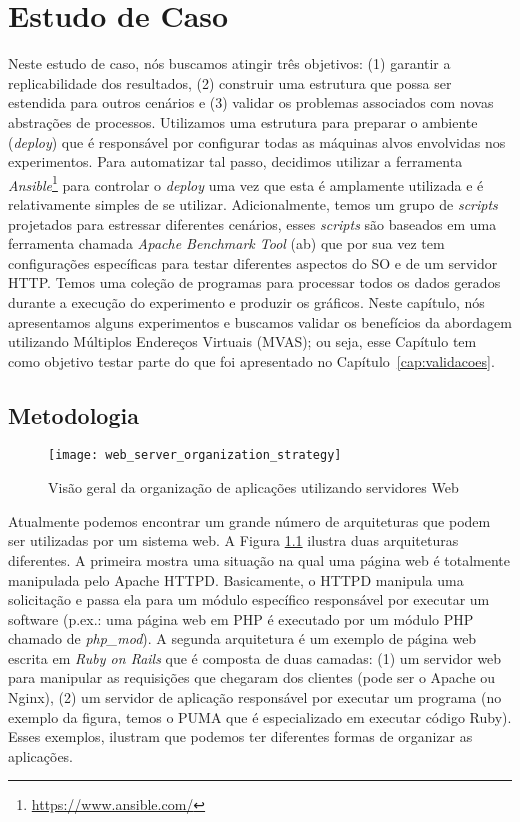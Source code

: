 \chapter{Estudo de Caso}
\label{cap:estudo-de-caso}

Neste estudo de caso, nós buscamos atingir três objetivos: (1) garantir a
replicabilidade dos resultados, (2) construir uma estrutura que possa ser
estendida para outros cenários e (3) validar os problemas associados com novas
abstrações de processos. Utilizamos uma estrutura para preparar o ambiente
(\emph{deploy}) que é responsável por configurar todas as máquinas alvos
envolvidas nos experimentos. Para automatizar tal passo, decidimos utilizar a
ferramenta \emph{Ansible}\footnote{\url{https://www.ansible.com/}} para
controlar o \emph{deploy} uma vez que esta é amplamente utilizada e é
relativamente simples de se utilizar. Adicionalmente, temos um grupo de \emph{scripts}
projetados para estressar diferentes cenários, esses \emph{scripts} são baseados em
uma ferramenta chamada \emph{Apache Benchmark Tool} (ab) que por sua vez tem
configurações específicas para testar diferentes aspectos do SO e de um servidor
HTTP. Temos uma coleção de programas para processar todos os dados gerados
durante a execução do experimento e produzir os gráficos. Neste capítulo, nós
apresentamos alguns experimentos e buscamos validar os benefícios da abordagem
utilizando Múltiplos Endereços Virtuais (MVAS); ou seja, esse Capítulo tem como
objetivo testar parte do que foi apresentado no Capítulo~\ref{cap:validacoes}.

\section{Metodologia} \label{sec:metodologia}

\begin{figure}[!h] \centering
  \texttt{[image: web\_server\_organization\_strategy]}
  \caption{Visão geral da organização de aplicações utilizando servidores Web}
\label{fig:web_server} \end{figure}

Atualmente podemos encontrar um grande número de arquiteturas que podem ser
utilizadas por um sistema web. A Figura \ref{fig:web_server} ilustra duas
arquiteturas diferentes. A primeira mostra uma situação na qual uma página web
é totalmente manipulada pelo Apache HTTPD. Basicamente, o HTTPD manipula uma
solicitação e passa ela para um módulo específico responsável por executar um
software (p.ex.: uma página web em PHP é executado por um módulo PHP chamado de
\emph{php\_mod}). A segunda arquitetura é um exemplo de página web escrita em
\emph{Ruby on Rails} que é composta de duas camadas: (1) um servidor web para
manipular as requisições que chegaram dos clientes (pode ser o Apache ou
Nginx), (2) um servidor de aplicação responsável por executar um programa (no
exemplo da figura, temos o PUMA que é especializado em executar código Ruby).
Esses exemplos, ilustram que podemos ter diferentes formas de organizar as
aplicações.

